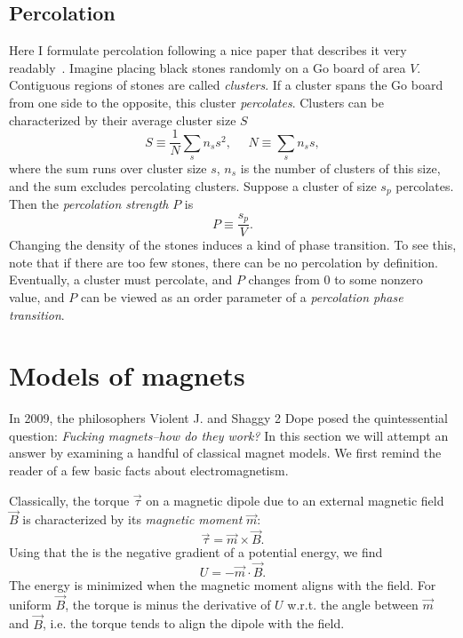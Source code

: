 \subsection{Percolation}\label{sec:percolation}

Here I formulate percolation following a nice paper that describes it
very readably~\cite{Fortunato:1999xj}. Imagine placing black stones randomly on
a Go board of area $V$. Contiguous regions of stones are called {\it
clusters}. If a cluster spans the Go board from one side to the
opposite, this cluster {\it percolates}.
Clusters can be characterized by their average cluster size $S$
\begin{equation}
S\equiv\frac{1}{N}\sum_s n_s s^2,~~~~~~ N\equiv \sum_s n_s s,
\end{equation} 
where the sum runs over cluster size $s$, $n_s$ is the number of clusters of
this size, and the sum excludes percolating clusters. Suppose a cluster
of size $s_p$ percolates. Then the {\it percolation
strength} $P$ is
\begin{equation}
P\equiv \frac{s_p}{V}.
\end{equation}
Changing the density of the stones induces a kind of phase transition. To see this,
note that if there are too few stones, there can be no percolation by
definition. Eventually, a cluster must percolate, and $P$ changes from 0 to some
nonzero value, and $P$ can be viewed as an order parameter of a
{\it percolation phase transition}.



\section{Models of magnets}\label{sec:magnets}

In 2009, the philosophers Violent J. and Shaggy 2 Dope posed the quintessential
question: {\it Fucking magnets--how do they work?} In this section we will attempt 
an answer by examining a handful of classical magnet models. We first remind 
the reader of a few basic facts about electromagnetism.

Classically, the torque $\vec\tau$ on a magnetic dipole due to an external
magnetic field $\vec B$ is characterized by its {\it magnetic moment} $\vec m$:
\begin{equation}
\vec\tau = \vec m\times\vec B.
\end{equation}
Using that the is the negative gradient of a potential energy, we find
\begin{equation}\label{eq:magneticmomentU}
U=-\vec m\cdot\vec B.
\end{equation}
The energy is minimized when the magnetic moment aligns with the field.
For uniform $\vec B$, the torque is minus the derivative of $U$ w.r.t. the angle
between $\vec m$ and $\vec B$, i.e. the torque tends to align the dipole with
the field.

